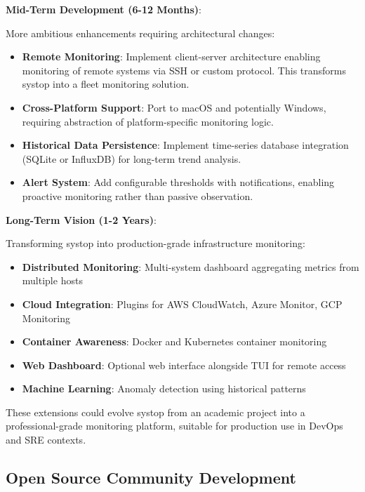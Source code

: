\documentclass[12pt,a4paper,oneside]{report}
\begin{document}
\textbf{Mid-Term Development (6-12 Months)}:

More ambitious enhancements requiring architectural changes:

\begin{itemize}
    \item \textbf{Remote Monitoring}: Implement client-server architecture enabling monitoring of remote systems via SSH or custom protocol. This transforms systop into a fleet monitoring solution.
    
    \item \textbf{Cross-Platform Support}: Port to macOS and potentially Windows, requiring abstraction of platform-specific monitoring logic.
    
    \item \textbf{Historical Data Persistence}: Implement time-series database integration (SQLite or InfluxDB) for long-term trend analysis.
    
    \item \textbf{Alert System}: Add configurable thresholds with notifications, enabling proactive monitoring rather than passive observation.
\end{itemize}

\textbf{Long-Term Vision (1-2 Years)}:

Transforming systop into production-grade infrastructure monitoring:

\begin{itemize}
    \item \textbf{Distributed Monitoring}: Multi-system dashboard aggregating metrics from multiple hosts
    \item \textbf{Cloud Integration}: Plugins for AWS CloudWatch, Azure Monitor, GCP Monitoring
    \item \textbf{Container Awareness}: Docker and Kubernetes container monitoring
    \item \textbf{Web Dashboard}: Optional web interface alongside TUI for remote access
    \item \textbf{Machine Learning}: Anomaly detection using historical patterns
\end{itemize}

These extensions could evolve systop from an academic project into a professional-grade monitoring platform, suitable for production use in DevOps and SRE contexts.

\subsection{Open Source Community Development}
\end{document}
